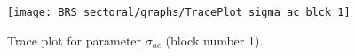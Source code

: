 \begin{figure}[H]
\centering
  \texttt{[image: BRS\_sectoral/graphs/TracePlot\_sigma\_ac\_blck\_1]}\\
    \caption{Trace plot for parameter ${\sigma_{ac}}$ (block number 1).}
\end{figure}
